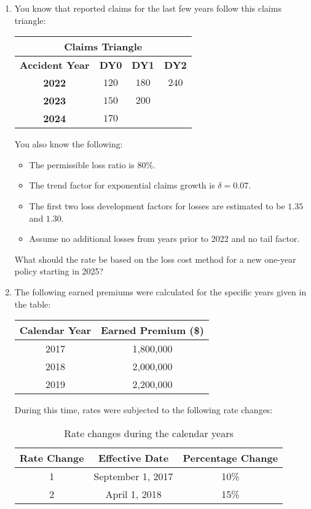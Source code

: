 \documentclass{article}
\begin{document}
\begin{enumerate}
\item 
You know that reported claims for the last few years follow this claims triangle:
\begin{table}[htbp]
    \centering
    \begin{tabular}{|c|c|c|c|}
    \hline
    \multicolumn{4}{|c|}{\textbf{Claims Triangle}} \\ \hline
    \textbf{Accident Year} & \textbf{DY0} & \textbf{DY1} & \textbf{DY2} \\ \hline
    \textbf{2022} & $120$ & $180$ & $240$ \\ \hline
    \textbf{2023} & $150$ & $200$ &  \\ \hline
    \textbf{2024} & $170$ & &  \\ \hline
    \end{tabular}
\end{table}
You also know the following:
\begin{itemize}
\item The permissible loss ratio is $80\%$.
\item The trend factor for exponential claims growth is $\delta = 0.07$.
\item The first two loss development factors for losses are estimated to be $1.35$ and $1.30$.
\item Assume no additional losses from years prior to 2022 and no tail factor.
\end{itemize}
What should the rate be based on the loss cost method for a new one-year policy starting in 2025?

\newpage

\item  
The following earned premiums were calculated for the specific years given in the table:
\begin{table}[h]
\centering
\begin{tabular}{@{}cc@{}}
\toprule
Calendar Year & Earned Premium (\$) \\ \midrule
2017          & 1,800,000           \\
2018          & 2,000,000           \\
2019          & 2,200,000           \\ \bottomrule
\end{tabular}
\end{table}

During this time, rates were subjected to the following rate changes:
\begin{table}[h]
\centering
\begin{tabular}{@{}ccc@{}}
\toprule
Rate Change & Effective Date  & Percentage Change \\ \midrule
1           & September 1, 2017 & 10\%              \\
2           & April 1, 2018    & 15\%              \\ \bottomrule
\end{tabular}
\caption{Rate changes during the calendar years}
\end{table}



\end{enumerate}
\end{document}
